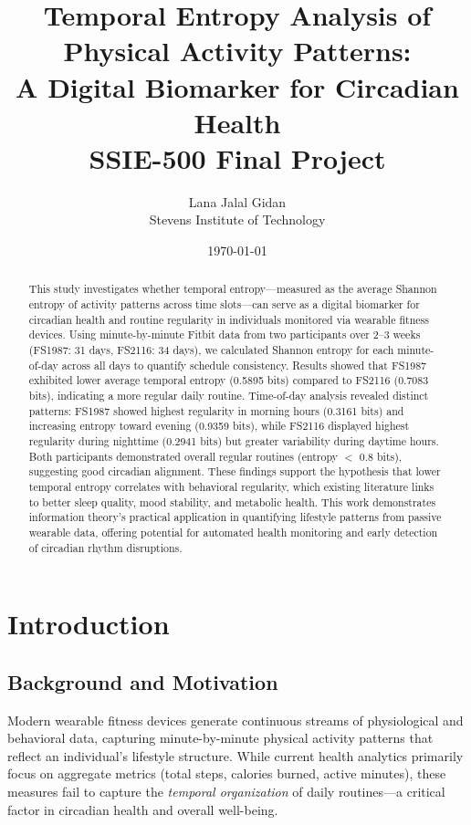 \documentclass[12pt,letterpaper]{article}
\title{\textbf{Temporal Entropy Analysis of Physical Activity Patterns:\\A Digital Biomarker for Circadian Health}\\
\vspace{0.5cm}
\large SSIE-500 Final Project}
\author{Lana Jalal Gidan\\
Stevens Institute of Technology}
\date{\today}
\begin{document}
\maketitle
\thispagestyle{empty}

\begin{abstract}
This study investigates whether temporal entropy—measured as the average Shannon entropy of activity patterns across time slots—can serve as a digital biomarker for circadian health and routine regularity in individuals monitored via wearable fitness devices. Using minute-by-minute Fitbit data from two participants over 2--3 weeks (FS1987: 31 days, FS2116: 34 days), we calculated Shannon entropy for each minute-of-day across all days to quantify schedule consistency. Results showed that FS1987 exhibited lower average temporal entropy (0.5895 bits) compared to FS2116 (0.7083 bits), indicating a more regular daily routine. Time-of-day analysis revealed distinct patterns: FS1987 showed highest regularity in morning hours (0.3161 bits) and increasing entropy toward evening (0.9359 bits), while FS2116 displayed highest regularity during nighttime (0.2941 bits) but greater variability during daytime hours. Both participants demonstrated overall regular routines (entropy $<$ 0.8 bits), suggesting good circadian alignment. These findings support the hypothesis that lower temporal entropy correlates with behavioral regularity, which existing literature links to better sleep quality, mood stability, and metabolic health. This work demonstrates information theory's practical application in quantifying lifestyle patterns from passive wearable data, offering potential for automated health monitoring and early detection of circadian rhythm disruptions.
\end{abstract}

\newpage
\tableofcontents
\newpage

\section{Introduction}

\subsection{Background and Motivation}

Modern wearable fitness devices generate continuous streams of physiological and behavioral data, capturing minute-by-minute physical activity patterns that reflect an individual's lifestyle structure. While current health analytics primarily focus on aggregate metrics (total steps, calories burned, active minutes), these measures fail to capture the \textit{temporal organization} of daily routines—a critical factor in circadian health and overall well-being.
\end{document}
